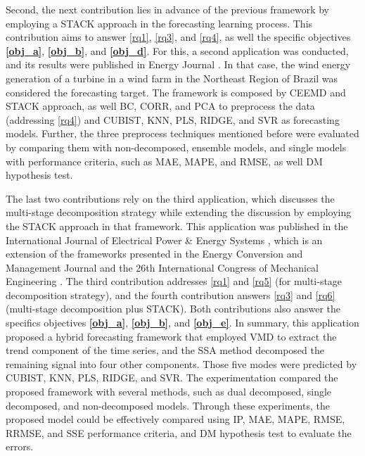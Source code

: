 Second, the next contribution lies in advance of the previous framework by employing a \ac{STACK} approach in the forecasting learning process. This contribution aims to answer \ref{rq1}, \ref{rq3}, and \ref{rq4}, as well the specific objectives \textbf{\ref{obj_a}}, \textbf{\ref{obj_b}}, and \textbf{\ref{obj_d}}. For this, a second application was conducted, and its results were published in Energy Journal \cite{dasilva2021Novel}. In that case, the wind energy generation of a turbine in a wind farm in the Northeast Region of Brazil was considered the forecasting target. The framework is composed by \ac{CEEMD} and \ac{STACK} approach, as well \ac{BC}, \ac{CORR}, and \ac{PCA} to preprocess the data (addressing \ref{rq4}) and \ac{CUBIST}, \ac{KNN}, \ac{PLS}, \ac{RIDGE}, and \ac{SVR} as forecasting models. Further, the three preprocess techniques mentioned before were evaluated by comparing them with non-decomposed, ensemble models, and single models with performance criteria, such as \ac{MAE}, \ac{MAPE}, and \ac{RMSE}, as well \ac{DM} hypothesis test.

The last two contributions rely on the third application, which discusses the multi-stage decomposition strategy while extending the discussion by employing the \ac{STACK} approach in that framework. This application was published in the International Journal of Electrical Power \& Energy Systems \cite{dasilva2022Multistep}, which is an extension of the frameworks presented in the Energy Conversion and Management Journal \cite{moreno2020Multistep} and the 26th International Congress of Mechanical Engineering \cite{dasilva2021Multistep}. The third contribution addresses \ref{rq1} and \ref{rq5} (for multi-stage decomposition strategy), and the fourth contribution answers \ref{rq3} and \ref{rq6} (multi-stage decomposition plus \ac{STACK}). Both contributions also answer the specifics objectives \textbf{\ref{obj_a}}, \textbf{\ref{obj_b}}, and \textbf{\ref{obj_e}}. In summary, this application proposed a hybrid forecasting framework that employed \ac{VMD} to extract the trend component of the time series, and the \ac{SSA} method decomposed the remaining signal into four other components. Those five modes were predicted by \ac{CUBIST}, \ac{KNN}, \ac{PLS}, \ac{RIDGE}, and \ac{SVR}. The experimentation compared the proposed framework with several methods, such as dual decomposed, single decomposed, and non-decomposed models. Through these experiments, the proposed model could be effectively compared using \ac{IP}, \ac{MAE}, \ac{MAPE}, \ac{RMSE}, \ac{RRMSE}, and \ac{SSE} performance criteria, and \ac{DM} hypothesis test to evaluate the errors.